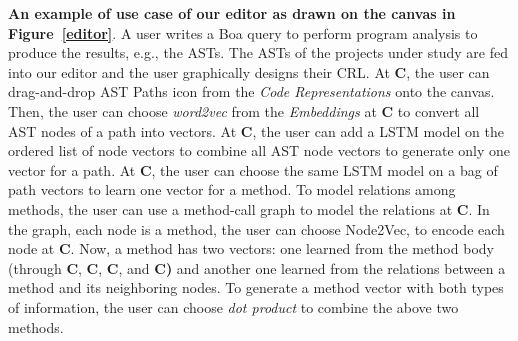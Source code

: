 \textbf{An example of use case of our editor as drawn on the canvas in
  Figure~\ref{editor}}.  A user
writes a Boa query to perform program analysis to produce the results,
e.g., the ASTs. The ASTs of the projects under study are fed into our
editor and the user graphically designs their CRL. At
\textbf{C}, the user can drag-and-drop AST Paths icon from
the \textit{Code Representations} onto the canvas.  Then, the user can
choose \textit{word2vec} from the \textit{Embeddings} at
\textbf{C} to convert all AST nodes of a path into vectors.
At \textbf{C}, the user can add a LSTM model on the ordered
list of node vectors to combine all AST node vectors to generate only
one vector for a path. At \textbf{C}, the user can choose
the same LSTM model on a bag of path vectors to learn one vector for a
method.  To model relations among methods, the user can use a
method-call graph to model the relations at \textbf{C}. In
the graph, each node is a method, the user can choose Node2Vec, to
encode each node at \textbf{C}. Now, a method has two
vectors: one learned from the method body (through
\textbf{C}, \textbf{C}, \textbf{C},
and \textbf{C)} and another one learned from the relations
between a method and its neighboring nodes. To generate a method
vector with both types of information, the user can choose
\textit{dot product} to combine the above two methods.


